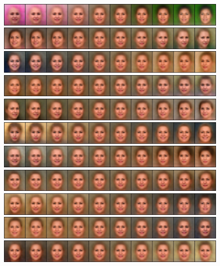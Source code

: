 \documentclass{article}
\begin{document}
\begin{figure}[H]
  \centering
  \includegraphics[width=0.9\linewidth]{eigen/raw_vae_0.png}
  \includegraphics[width=0.9\linewidth]{eigen/raw_vae_1.png}
  \includegraphics[width=0.9\linewidth]{eigen/raw_vae_2.png}
  \includegraphics[width=0.9\linewidth]{eigen/raw_vae_3.png}
  \includegraphics[width=0.9\linewidth]{eigen/raw_vae_4.png}
  \includegraphics[width=0.9\linewidth]{eigen/raw_vae_5.png}
  \includegraphics[width=0.9\linewidth]{eigen/raw_vae_6.png}
  \includegraphics[width=0.9\linewidth]{eigen/raw_vae_7.png}
  \includegraphics[width=0.9\linewidth]{eigen/raw_vae_8.png}
  \includegraphics[width=0.9\linewidth]{eigen/raw_vae_9.png}
  \includegraphics[width=0.9\linewidth]{eigen/raw_vae_10.png}

\end{figure}
\end{document}
